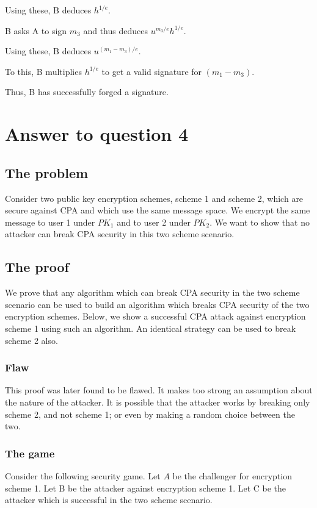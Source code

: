\documentclass[10pt]{amsart}
\begin{document}
Using these, B deduces $h^{1/e}$.

B asks A to sign $m_{3}$ and thus deduces $u^{m_{3}/e}h^{1/e}$.

Using these, B deduces $u^{(m_{1}-m_{3})/e}$.

To this, B multiplies $h^{1/e}$ to get a valid signature for $(m_{1}-m_{3})$.

Thus, B has successfully forged a signature.

\section{Answer to question 4}
\subsection{The problem}
Consider two public key encryption schemes, scheme 1 and scheme 2, which are secure against CPA and which use the same message space. We encrypt the same message to user 1 under $PK_{1}$ and to user 2 under $PK_{2}$. We want to show that no attacker can break CPA security in this two scheme scenario.

\subsection{The proof}
We prove that any algorithm which can break CPA security in the two scheme scenario can be used to build an algorithm which breaks CPA security of the two encryption schemes. Below, we show a successful CPA attack against encryption scheme 1 using such an algorithm. An identical strategy can be used to break scheme 2 also.

\subsubsection{Flaw}
This proof was later found to be flawed. It makes too strong an assumption about the nature of the attacker. It is possible that the attacker works by breaking only scheme 2, and not scheme 1; or even by making a random choice between the two.

\subsubsection{The game}
Consider the following security game. Let $A$ be the challenger for encryption scheme 1. Let B be the attacker against encryption scheme 1. Let C be the attacker which is successful in the two scheme scenario.
\end{document}
